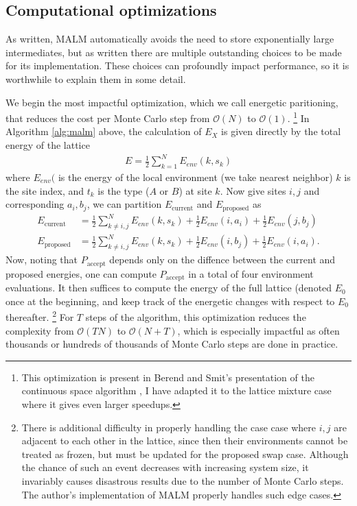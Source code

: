 \documentclass[10pt]{article}
\begin{document}
\subsection{Computational optimizations}
As written, MALM automatically avoids the need to store exponentially large intermediates, but as written there are multiple outstanding choices to be made for its implementation.
These choices can profoundly impact performance, so it is worthwhile to explain them in some detail.

We begin the most impactful optimization, which we call energetic paritioning, that reduces the cost per Monte Carlo step from $\mathcal{O}(N)$ to $\mathcal{O}(1)$. \footnote{This optimization is present in Berend and Smit's presentation of the continuous space algorithm \cite{md}, I have adapted it to the lattice mixture case where it gives even larger speedups.}
In Algorithm \ref{alg:malm} above, the calculation of $E_{X}$ is given directly by the total energy of the lattice
\begin{align}
    E = \frac{1}{2} \sum_{k=1}^N E_{env}(k,s_k)
\end{align}
where $E_{env}($ is the energy of the local environment (we take nearest neighbor) $k$ is the site index, and $t_k$ is the type ($A$ or $B$) at site $k$.
Now give sites $i,j$ and corresponding $a_i,b_j$, we can partition $E_{\text{current}}$ and $E_{\text{proposed}}$ as
\begin{align}
    E_{\text{current}} &= \frac{1}{2} \sum_{k \ne i,j}^N E_{env}(k,s_k) +
    \frac{1}{2} E_{env}(i,a_i) + \frac{1}{2} E_{env}(j,b_j) \\
    E_{\text{proposed}} &= \frac{1}{2} \sum_{k \ne i,j}^N E_{env}(k,s_k) +
    \frac{1}{2} E_{env}(i,b_j) + \frac{1}{2} E_{env}(i,a_i).
\end{align}
Now, noting that $P_{\text{accept}}$ depends only on the diffence between the current and proposed energies, one can compute $P_{\text{accept}}$ in a total of four environment evaluations.
It then suffices to compute the energy of the full lattice (denoted $E_0$ once at the beginning, and keep track of the energetic changes with respect to $E_0$ thereafter. \footnote{There is additional difficulty in properly handling the case case where $i,j$ are adjacent to each other in the lattice, since then their environments cannot be treated as frozen, but must be updated for the proposed swap case.
Although the chance of such an event decreases with increasing system size, it invariably causes disastrous results due to the number of Monte Carlo steps.
The author's implementation of MALM properly handles such edge cases.}
For $T$ steps of the algorithm, this optimization reduces the complexity from $\mathcal{O}(TN)$ to $\mathcal{O}(N+T)$, which is especially impactful as often thousands or hundreds of thousands of Monte Carlo steps are done in practice.
\end{document}
